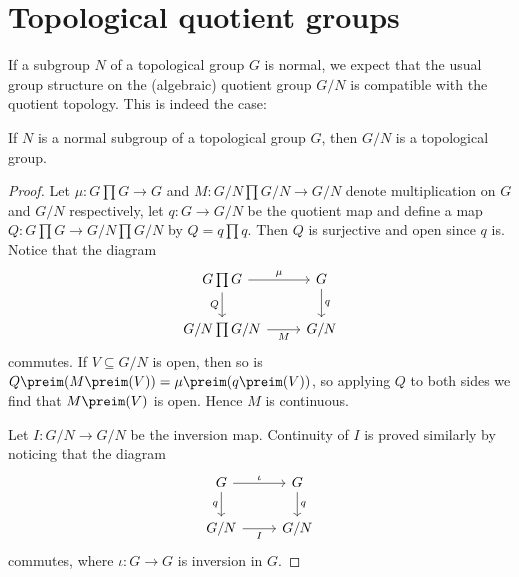 \documentclass[article, a4paper, 11pt, oneside]{memoir}
\numberwithin{equation}{chapter}
\begin{document}
\section{Topological quotient groups}

If a subgroup $N$ of a topological group $G$ is normal, we expect that the usual group structure on the (algebraic) quotient group $G/N$ is compatible with the quotient topology. This is indeed the case:

\begin{theorem}
    \label{thm:topological-quotient-group}
    If $N$ is a normal subgroup of a topological group $G$, then $G/N$ is a topological group.
\end{theorem}

\begin{proof}
    Let $\mu \colon G \prod G \to G$ and $M \colon G/N \prod G/N \to G/N$ denote multiplication on $G$ and $G/N$ respectively, let $q \colon G \to G/N$ be the quotient map and define a map $Q \colon G \prod G \to G/N \prod G/N$ by $Q = q \prod q$. Then $Q$ is surjective and open since $q$ is. Notice that the diagram
    \begin{equation*}
        \begin{tikzcd}
            G \prod G
                \ar[r, "\mu"]
                \ar[d, "Q", swap]
            & G
                \ar[d, "q"]
            \\
            G/N \prod G/N
                \ar[r, "M", swap]
            & G/N
        \end{tikzcd}
    \end{equation*}
    commutes. If $V \subseteq G/N$ is open, then so is $Q\preim(M\preim(V)) = \mu\preim(q\preim(V))$, so applying $Q$ to both sides we find that $M\preim(V)$ is open. Hence $M$ is continuous.

    Let $I \colon G/N \to G/N$ be the inversion map. Continuity of $I$ is proved similarly by noticing that the diagram
    \begin{equation*}
        \begin{tikzcd}
            G
                \ar[r, "\iota"]
                \ar[d, "q", swap]
            & G
                \ar[d, "q"]
            \\
            G/N
                \ar[r, "I", swap]
            & G/N
        \end{tikzcd}
    \end{equation*}
    commutes, where $\iota \colon G \to G$ is inversion in $G$.
\end{proof}
\end{document}

